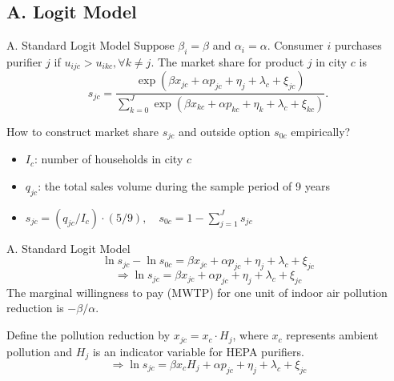 \documentclass{beamer}
\begin{document}
\subsection{A. Logit Model}
\begin{frame}[shrink]
	\transfade %
	\tableofcontents[sectionstyle=show/shaded,subsectionstyle=show/shaded/hide]
	\addtocounter{framenumber}{-1}
\end{frame}
\begin{frame}{A. Standard Logit Model}
	Suppose $\beta_i=\beta$ and $\alpha_i=\alpha$. Consumer $i$ purchases purifier $j$ if $u_{ijc}>u_{ikc},\forall k\neq j$. The market share for product $j$ in city $c$ is
	\begin{equation}
		s_{jc}=\frac{\exp(\beta x_{jc}+\alpha p_{jc}+\eta_j+\lambda_c+\xi_{jc})}{\sum_{k=0}^J\exp{(\beta x_{kc}+\alpha p_{kc}+\eta_k+\lambda_c+\xi_{kc})}}.
	\end{equation}
	\bigskip

	How to construct market share $s_{jc}$ and outside option $s_{0c}$ empirically?
	\begin{itemize}
		\item $I_c$: number of households in city $c$
		\item $q_{jc}$: the total sales volume during the sample period of 9 years
		\item $s_{jc}=(q_{jc}/I_c)\cdot (5/9),\quad s_{0c}=1-\sum_{j=1}^Js_{jc}$
	\end{itemize}
\end{frame}
\begin{frame}{A. Standard Logit Model}
	$$\ln s_{jc}-\ln s_{0c}=\beta x_{jc}+\alpha p_{jc}+\eta_j+\lambda_c+\xi_{jc}$$
	\begin{equation}
		\Rightarrow \ln s_{jc}=\beta x_{jc}+\alpha p_{jc}+\eta_j+\lambda_c+\xi_{jc}
	\end{equation}
	The marginal willingness to pay (MWTP) for one unit of indoor air pollution reduction is $-\beta/\alpha$.
	\bigskip

	Define the pollution reduction by $x_{jc}=x_c\cdot H_j$, where $x_c$ represents ambient pollution and $H_j$ is an indicator variable for HEPA purifiers.
	\begin{equation}
		\Rightarrow \ln s_{jc}=\beta x_cH_j+\alpha p_{jc}+\eta_j+\lambda_c+\xi_{jc}
	\end{equation}
\end{frame}
\end{document}
